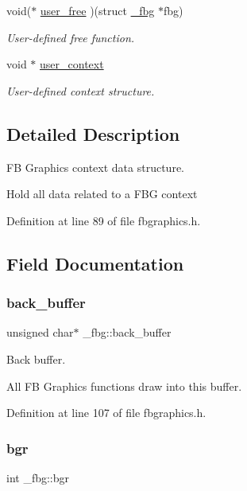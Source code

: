 \begin{DoxyCompactItemize}
void($\ast$ \mbox{\hyperlink{struct__fbg_a88d48b502672cfb8bd2c94ea3feac8d0}{user\+\_\+free}} )(struct \mbox{\hyperlink{struct__fbg}{\+\_\+fbg}} $\ast$fbg)
\begin{DoxyCompactList}\small\item\em User-\/defined free function. \end{DoxyCompactList}\item 
void $\ast$ \mbox{\hyperlink{struct__fbg_ae3ecac18abee9dedabacaca9bb063bde}{user\+\_\+context}}
\begin{DoxyCompactList}\small\item\em User-\/defined context structure. \end{DoxyCompactList}\end{DoxyCompactItemize}


\subsection{Detailed Description}
FB Graphics context data structure. 

Hold all data related to a F\+BG context 

Definition at line 89 of file fbgraphics.\+h.



\subsection{Field Documentation}
\mbox{\label{struct__fbg_a907e7fc97965b972c17114c885e53735}} 
\subsubsection{\texorpdfstring{back\+\_\+buffer}{back\_buffer}}
{\footnotesize\ttfamily unsigned char$\ast$ \+\_\+fbg\+::back\+\_\+buffer}



Back buffer. 

All FB Graphics functions draw into this buffer. 

Definition at line 107 of file fbgraphics.\+h.

\mbox{\label{struct__fbg_a5844c5bf4789117cbc0c972ff160b338}} 
\subsubsection{\texorpdfstring{bgr}{bgr}}
{\footnotesize\ttfamily int \+\_\+fbg\+::bgr}



